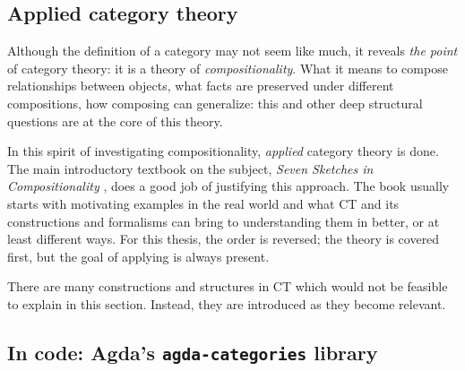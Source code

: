 
\subsection{Applied category theory}

Although the definition of a category may not seem like much, it reveals \textit{the point} of category theory: it is a theory of \textit{compositionality}. What it means to compose relationships between objects, what facts are preserved under different compositions, how composing can generalize: this and other deep structural questions are at the core of this theory. 

In this spirit of investigating compositionality, \textit{applied} category theory is done. The main introductory textbook on the subject, \textit{Seven Sketches in Compositionality} \cite{seven-sketches}, does a good job of justifying this approach. The book usually starts with motivating examples in the real world and what CT and its constructions and formalisms can bring to understanding them in better, or at least different ways. For this thesis, the order is reversed; the theory is covered first, but the goal of applying is always present.

There are many constructions and structures in CT which would not be feasible to explain in this section. Instead, they are introduced as they become relevant.






\subsection{In code: Agda's \texttt{agda-categories} library}

